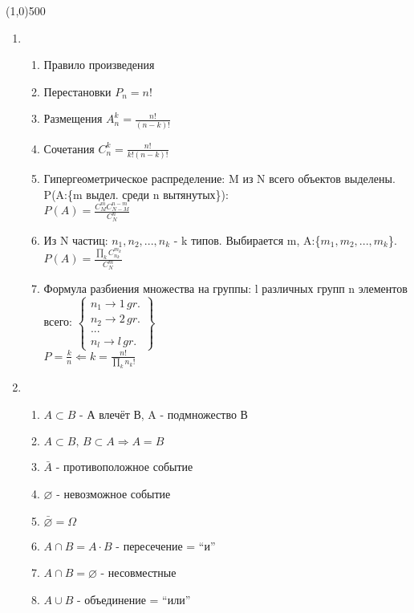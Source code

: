 


\fontsize{20}{24}
\line(1,0){500}
\fontsize{12}{15}
\begin{enumerate}
\item \begin{enumerate}
      \item Правило произведения
      \item Перестановки $ P_n = n! $
      \item Размещения $ A^k_n = \frac{n!}{(n-k)!} $
      \item Сочетания $ C^k_n = \frac{n!}{k!(n-k)!} $
      \item Гипергеометрическое распределение: M из N всего объектов выделены. P(A:\{m выдел. среди n вытянутых\}):\\
      $ P(A)=\frac{C^m_M C^{n-m}_{N-M}}{C^n_N} $
      \item Из N частиц: ${n_1,n_2,...,n_k}$ - k типов. Выбирается m, A:\{${m_1,m_2,...,m_k}$\}.\\
      $ P(A)=\frac{\prod\limits_k C^{m_k}_{n_k}}{C^m_N} $
      \item Формула разбиения множества на группы: l различных групп n элементов всего:
      $ \left\{ \begin{smallmatrix}
      n_1 \rightarrow 1\, gr. \\n_2 \rightarrow 2\, gr. \\...\\n_l\rightarrow l\, gr.
      \end{smallmatrix} \right\} $\\
      $ P=\frac{k}{n} \Leftarrow k=\frac{n!}{\prod\limits_k n_k!} $
      \end{enumerate}
\item \begin{enumerate}
      \item $A \subset B$ - А влечёт В, A - подмножество В
      \item $A\subset B,\,B\subset A \Rightarrow A=B$
      \item $\bar{A}$ - противоположное событие
      \item $\varnothing$ - невозможное событие
      \item $\bar{\varnothing}=\Omega$
      \item $A\cap B = A\cdot B$ - пересечение = ``и''
      \item $A\cap B = \varnothing$ - несовместные
      \item $A\cup B$ - объединение = ``или''

\end{enumerate}
\end{enumerate}
